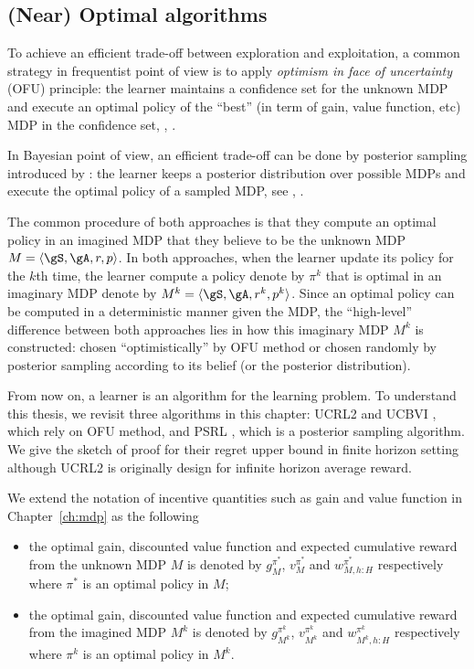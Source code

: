 \subsection{(Near) Optimal algorithms}

To achieve an efficient trade-off between exploration and exploitation, a common strategy in frequentist point of view is to apply \emph{optimism in face of uncertainty} (OFU) principle: the learner maintains a confidence set for the unknown MDP and execute an optimal policy of the
“best” (in term of gain, value function, etc) MDP in the confidence set, \eg, \cite{ortner2020regret, bourel2020tightening, zhang2019regret, zanette2019tighter, fruit2018near, fruit2018efficient, jin2018q, fruit2017regret,azar2017minimax, bartlett2012regal, filippi2010optimism, jaksch2010near}.

In Bayesian point of view, an efficient trade-off can be done by posterior sampling introduced by \cite{thompson1933likelihood}: the learner keeps a posterior distribution over possible MDPs and execute the optimal policy of a sampled MDP, see \eg, \cite{osband2013more, gopalan2015thompson, ouyang2017learning}.

The common procedure of both approaches is that they compute an optimal policy in an imagined MDP that they believe to be the unknown MDP $M=\langle\gS,\gA,r,p\rangle$.
In both approaches, when the learner update its policy for the $k$th time, the learner compute a policy denote by $\pi^k$ that is optimal in an imaginary MDP denote by $M^k=\langle\gS,\gA,r^k,p^k\rangle$.
Since an optimal policy can be computed in a deterministic manner given the MDP, the ``high-level'' difference between both approaches lies in how this imaginary MDP $M^k$ is constructed: chosen ``optimistically'' by OFU method or chosen randomly by posterior sampling according to its belief (or the posterior distribution).

From now on, a learner is an algorithm for the learning problem.
To understand this thesis, we revisit three algorithms in this chapter: UCRL2 \cite{jaksch2010near} and UCBVI \cite{azar2017minimax}, which rely on OFU method, and PSRL \cite{osband2013more}, which is a posterior sampling algorithm.
We give the sketch of proof for their regret upper bound in finite horizon setting although UCRL2 is originally design for infinite horizon average reward.

We extend the notation of incentive quantities such as gain and value function in Chapter~\ref{ch:mdp} as the following
\begin{itemize}
    \item the optimal gain, discounted value function and expected cumulative reward from the unknown MDP $M$ is denoted by $g^{\pi^*}_M$, $v^{\pi^*}_M$ and $w^{\pi^*}_{M,h:H}$ respectively where $\pi^*$ is an optimal policy in $M$;
    \item the optimal gain, discounted value function and expected cumulative reward from the imagined MDP $M^k$ is denoted by $g^{\pi^k}_{M^k}$, $v^{\pi^k}_{M^k}$ and $w^{\pi^k}_{M^k,h:H}$ respectively where $\pi^k$ is an optimal policy in $M^k$.
\end{itemize}

